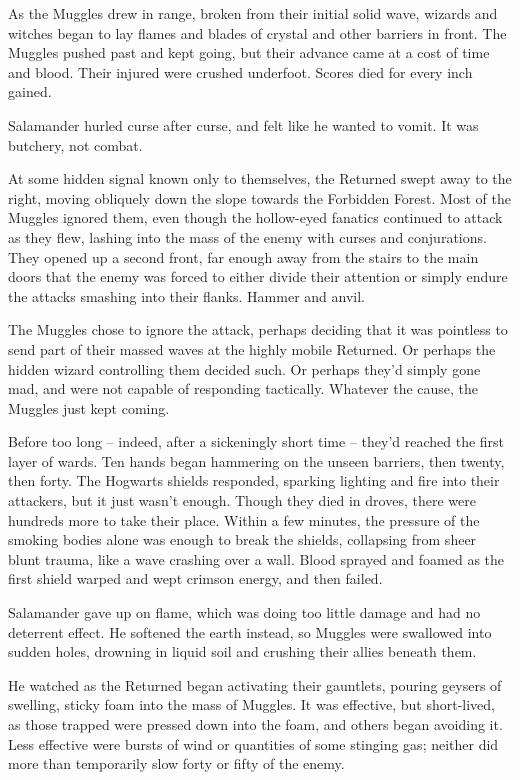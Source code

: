 As the Muggles drew in range, broken from their initial solid wave,
wizards and witches began to lay flames and blades of crystal and other
barriers in front. The Muggles pushed past and kept going, but their
advance came at a cost of time and blood. Their injured were crushed
underfoot. Scores died for every inch gained.

Salamander hurled curse after curse, and felt like he wanted to vomit.
It was butchery, not combat.

At some hidden signal known only to themselves, the Returned swept away
to the right, moving obliquely down the slope towards the Forbidden
Forest. Most of the Muggles ignored them, even though the hollow-eyed
fanatics continued to attack as they flew, lashing into the mass of the
enemy with curses and conjurations. They opened up a second front, far
enough away from the stairs to the main doors that the enemy was forced
to either divide their attention or simply endure the attacks smashing
into their flanks. Hammer and anvil.

The Muggles chose to ignore the attack, perhaps deciding that it was
pointless to send part of their massed waves at the highly mobile
Returned. Or perhaps the hidden wizard controlling them decided such. Or
perhaps they'd simply gone mad, and were not capable of responding
tactically. Whatever the cause, the Muggles just kept coming.

Before too long -- indeed, after a sickeningly short time -- they'd
reached the first layer of wards. Ten hands began hammering on the
unseen barriers, then twenty, then forty. The Hogwarts shields
responded, sparking lighting and fire into their attackers, but it just
wasn't enough. Though they died in droves, there were hundreds more to
take their place. Within a few minutes, the pressure of the smoking
bodies alone was enough to break the shields, collapsing from sheer
blunt trauma, like a wave crashing over a wall. Blood sprayed and foamed
as the first shield warped and wept crimson energy, and then failed.

Salamander gave up on flame, which was doing too little damage and had
no deterrent effect. He softened the earth instead, so Muggles were
swallowed into sudden holes, drowning in liquid soil and crushing their
allies beneath them.

He watched as the Returned began activating their gauntlets, pouring
geysers of swelling, sticky foam into the mass of Muggles. It was
effective, but short-lived, as those trapped were pressed down into the
foam, and others began avoiding it. Less effective were bursts of wind
or quantities of some stinging gas; neither did more than temporarily
slow forty or fifty of the enemy.

